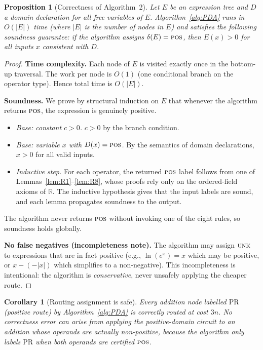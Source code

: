 \documentclass[12pt,a4paper]{article}
\newtheorem{corollary}[theorem]{Corollary}
\newtheorem{proposition}[theorem]{Proposition}
\theoremstyle{definition}
\newcommand{\POS}{\textsc{pos}}
\newcommand{\UNK}{\textsc{unk}}
\begin{document}
\begin{proposition}[Correctness of Algorithm~2]
\label{prop:correctness}
Let $E$ be an expression tree and $D$ a domain declaration for all free variables
of $E$.  Algorithm~\ref{alg:PDA} runs in $O(|E|)$ time (where $|E|$ is the number
of nodes in $E$) and satisfies the following soundness guarantee: if the
algorithm assigns $\delta(E) = \POS$, then $E(x) > 0$ for all inputs $x$
consistent with $D$.
\end{proposition}

\begin{proof}
\textbf{Time complexity.}
Each node of $E$ is visited exactly once in the bottom-up traversal.  The work
per node is $O(1)$ (one conditional branch on the operator type).  Hence total
time is $O(|E|)$.

\textbf{Soundness.}
We prove by structural induction on $E$ that whenever the algorithm returns
$\POS$, the expression is genuinely positive.
\begin{itemize}
  \item \emph{Base: constant $c > 0$.}  $c > 0$ by the branch condition.
  \item \emph{Base: variable $x$ with $D(x) = \POS$.}  By the semantics of
        domain declarations, $x > 0$ for all valid inputs.
  \item \emph{Inductive step.}  For each operator, the returned $\POS$ label
        follows from one of Lemmas~\ref{lem:R1}--\ref{lem:R8}, whose proofs
        rely only on the ordered-field axioms of $\mathbb{R}$.  The inductive
        hypothesis gives that the input labels are sound, and each lemma
        propagates soundness to the output.
\end{itemize}
The algorithm never returns $\POS$ without invoking one of the eight rules, so
soundness holds globally.

\textbf{No false negatives (incompleteness note).}
The algorithm may assign $\UNK$ to expressions that are in fact positive (e.g.,
$\ln(e^x) = x$ which may be positive, or $x - (-|x|)$ which simplifies to a
non-negative).  This incompleteness is intentional: the algorithm is
\emph{conservative}, never unsafely applying the cheaper route.
\end{proof}

\begin{corollary}[Routing assignment is safe]
\label{cor:routing-safe}
Every addition node labelled $\mathrm{PR}$ (positive route) by Algorithm~\ref{alg:PDA}
is correctly routed at cost $3n$.  No correctness error can arise from applying
the positive-domain circuit to an addition whose operands are actually
non-positive, because the algorithm only labels $\mathrm{PR}$ when both
operands are certified $\POS$.
\end{corollary}
\end{document}
